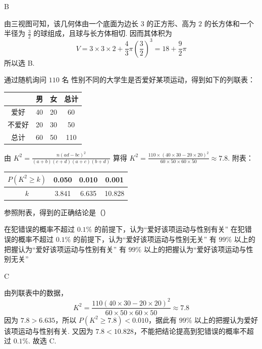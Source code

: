 \begin{answer}
B
\end{answer}

\begin{solution}
由三视图可知，该几何体由一个底面为边长 \(3\) 的正方形、高为 \(2\) 的长方体和一个半径为 \(\frac{3}{2}\) 的球组成，且球与长方体相切. 因而其体积为
\[
V=3\times3\times2+\frac{4}{3}\pi\left(\frac{3}{2}\right)^3=18+\frac{9}{2}\pi
\]
所以选 B.
\end{solution}

\begin{problem}
通过随机询问 \(110\text{ 名}\) 性别不同的大学生是否爱好某项运动，得到如下的列联表：

\begin{center}
\begin{tabular}{c|ccc}
 & 男 & 女 & 总计 \\
\hline
爱好 & 40 & 20 & 60 \\
不爱好 & 20 & 30 & 50 \\
总计 & 60 & 50 & 110
\end{tabular}
\end{center}

由 \(K^2 = \frac{n(ad - bc)^2}{(a + b)(c + d)(a + c)(b + d)}\) 算得 \(K^{2} = \frac{110 \times (40 \times 30 - 20 \times 20)^{2}}{60 \times 50 \times 60 \times 50} \approx 7.8\). 附表：

\begin{center}
\begin{tabular}{c|ccc}
\(P(K^2\geqslant k)\) & 0.050 & 0.010 & 0.001 \\
\hline
\(k\) & 3.841 & 6.635 & 10.828
\end{tabular}
\end{center}

参照附表，得到的正确结论是（\quad）

\choices
    {在犯错误的概率不超过 \(0.1\%\) 的前提下，认为“爱好该项运动与性别有关”}
    {在犯错误的概率不超过 \(0.1\%\) 的前提下，认为“爱好该项运动与性别无关”}
    {有 \(99\%\) 以上的把握认为“爱好该项运动与性别有关”}
    {有 \(99\%\) 以上的把握认为“爱好该项运动与性别无关”}
\end{problem}

\begin{answer}
C
\end{answer}

\begin{solution}
由列联表中的数据，
\[
K^2=\frac{110(40\times30-20\times20)^2}{60\times50\times60\times50}
\approx7.8
\]
因为 \(7.8>6.635\)，所以 \(P(K^2\geqslant7.8)<0.010\)，据此有 \(99\%\) 以上的把握认为爱好该项运动与性别有关. 又因为 \(7.8<10.828\)，不能把结论提高到犯错误的概率不超过 \(0.1\%\). 故选 C.
\end{solution}

